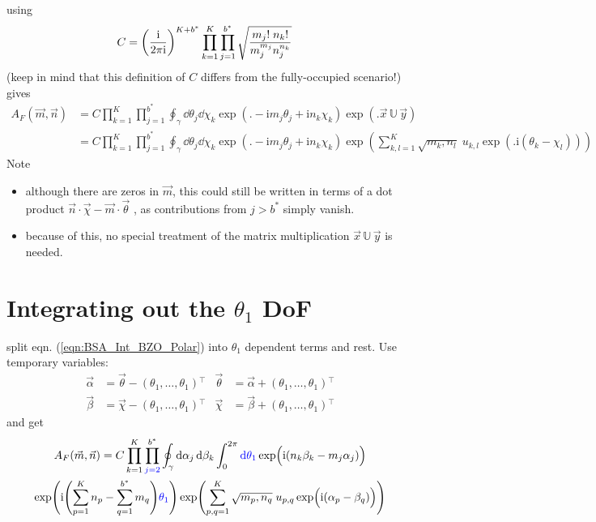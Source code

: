 \documentclass[
	english,
	a4paper,
	fontsize=10pt,
	parskip=half,
	titlepage=true,
	DIV=12,
	final
]{scrreprt}
\newcommand*{\transp}{\ensuremath{^\intercal}}
\newcommand*{\iunit}{\ensuremath{\mathrm{i}}}
\begin{document}
using
\begin{align}
	C
&=
	\qty(
		\frac{\iunit}{2\pi\iunit}
	)^{K + b^*}
	\prod_{k=1}^{K}
	\prod_{j=1}^{b^*}
		\sqrt{\frac
			{m_j! \; n_k!}
			{m_j^{m_j}  n_j^{n_k}}
		}
\end{align}
({\color{red}keep in mind that this definition of $C$ differs from the fully-occupied scenario!})
gives
\begin{align}
	A_F(\vec{m}, \vec{n})
&=
	C
	\prod_{k=1}^{K}
	\prod_{j=1}^{b^*}
		\oint_{\gamma}
			\dd{\theta_j} \dd{\chi_k}
	\exp(
		\Big.
		-\iunit m_j \theta_j
		+\iunit n_k \chi  _k
	)
	\exp( \Big. \vec{x} \, \mathbb{U} \, \vec{y}) \\
&=
	C
	\prod_{k=1}^{K}
	\prod_{j=1}^{b^*}
		\oint_{\gamma}
			\dd{\theta_j} \dd{\chi_k}
	\exp(
		\Big.
		-\iunit m_j \theta_j
		+\iunit n_k \chi  _k
	)
	\exp(
		\sum_{k,l=1}^{K}
		\sqrt{m_k, n_l} \;
		u_{k,l}
		\exp(\Big.
			\iunit(\theta_k - \chi_l)
		)
	)
	\label{eqn:BSA_Int_BZO_Polar}
\end{align}
Note
\begin{itemize}
\item although there are zeros in $\vec{m}$, this could still be written in terms of a dot product
	$\vec{n} \cdot \vec{\chi} - \vec{m} \cdot \vec{\theta}$
	, as contributions from $j > b^*$ simply vanish.
\item because of this, no special treatment of the matrix multiplication $\vec{x} \, \mathbb{U} \, \vec{y}$ is needed.
\end{itemize}

\section{Integrating out the $\theta_1$ DoF}
split eqn. (\ref{eqn:BSA_Int_BZO_Polar}) into $\theta_1$ dependent terms and rest. Use temporary variables:
\begin{align}
	\vec{\alpha} &= \vec{\theta} - (\theta_1, \ldots, \theta_1)\transp
	&
	\vec{\theta} &= \vec{\alpha} + (\theta_1, \ldots, \theta_1)\transp
\\
	\vec{\beta } &= \vec{\chi  } - (\theta_1, \ldots, \theta_1)\transp
	&
	\vec{\chi  } &= \vec{\beta } + (\theta_1, \ldots, \theta_1)\transp
\end{align}
and get
\begin{multline}
	A_F(\vec{m}, \vec{n})
=
	C
	\prod_{k=1}^{K}
	\prod_{{\color{blue} j=2}}^{b^*}
		\oint_{\gamma}
			\dd{\alpha_j} \dd{\beta_k}
		\int_{0}^{2\pi} {\color{blue} \dd{\theta_1}}
			\exp(
				\Big.
				\iunit (
				n_k \beta _k   -
				m_j \alpha_j
			))
\\
	\exp(
		\iunit \qty(
			\sum_{p=1}^{K}   n_p   -
			\sum_{q=1}^{b^*} m_q
		)
		{\color{blue} \theta_1}
	)
	\exp(
		\sum_{p,q=1}^{K}
		\sqrt{m_p, n_q} \;
		u_{p,q}
		\exp(\Big.
			\iunit(\alpha_p - \beta_q)
		)
	)
\end{multline}
\end{document}
